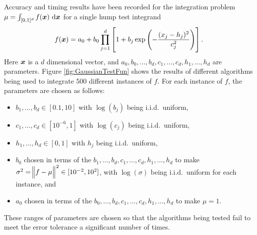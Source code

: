 \documentclass{iitthesis}
\theoremstyle{definition}
\begin{document}
\label{subsec:meanmcabssinglehump}
Accuracy and timing results have been recorded for the integration problem $\mu=\int_{[0,1]^d} f(\vx) \, \dif \vx$ for a single hump test integrand
\begin{equation} \label{GaussianTestFun}
f(\boldsymbol{x})=a_0 + b_0\prod_{j=1}^d\left[ 1 +b_j \exp \left(-\frac{(x_j-h_j)^2}{c_j^2}\right) \right].
\end{equation}
Here $\boldsymbol{x}$ is a $d$ dimensional vector, and $a_0, b_0, \ldots, b_d, c_1, \ldots, c_d, h_1, \ldots, h_d$ are parameters. Figure \ref{fig:GaussianTestFun} shows the results of different algorithms being used to integrate $500$ different instances of $f$.  For each instance of $f$, the parameters are chosen as follows:
\begin{itemize} 
\item $b_1, \ldots, b_d \in [0.1,10]$ with $\log(b_j)$ being i.i.d.\ uniform,
\item $c_1, \ldots, c_d \in [10^{-6},1]$ with $\log(c_j)$ being i.i.d.\ uniform,
\item $h_1, \ldots, h_d \in [0,1]$ with $h_j$ being i.i.d.\ uniform,
\item $b_0$ chosen in terms of the $b_1, \ldots, b_d, c_1, \ldots, c_d, h_1, \ldots, h_d$ to make $\sigma^2 =\norm[2]{f-\mu}^2 \in [10^{-2}, 10^2]$, with $\log(\sigma)$ being i.i.d.\ uniform for each instance, and
\item $a_0$ chosen in terms of the $b_0, \ldots, b_d, c_1, \ldots, c_d, h_1, \ldots, h_d$ to make $\mu=1$.
\end{itemize}
These ranges of parameters are chosen so that the algorithms being tested fail to meet the error tolerance a significant number of times.
\end{document}

